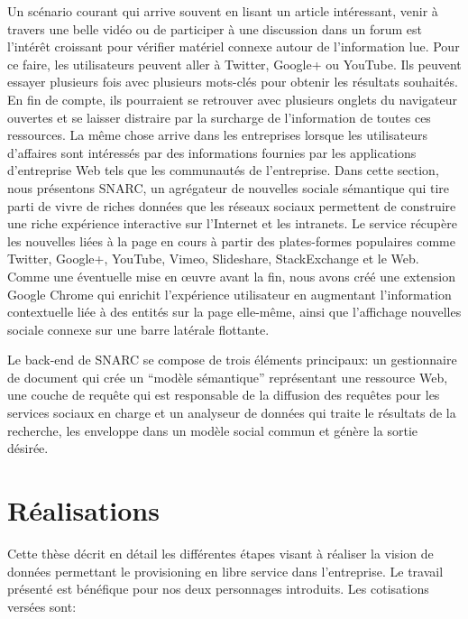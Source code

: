 \documentclass[a4paper,11pt,twoside]{ThesisStyle}
\begin{document}
Un scénario courant qui arrive souvent en lisant un article intéressant, venir à travers une belle vidéo ou de participer à une discussion dans un forum est l'intérêt croissant pour vérifier matériel connexe autour de l'information lue. Pour ce faire, les utilisateurs peuvent aller à Twitter, Google+ ou YouTube. Ils peuvent essayer plusieurs fois avec plusieurs mots-clés pour obtenir les résultats souhaités. En fin de compte, ils pourraient se retrouver avec plusieurs onglets du navigateur ouvertes et se laisser distraire par la surcharge de l'information de toutes ces ressources. La même chose arrive dans les entreprises lorsque les utilisateurs d'affaires sont intéressés par des informations fournies par les applications d'entreprise Web tels que les communautés de l'entreprise. Dans cette section, nous présentons SNARC, un agrégateur de nouvelles sociale sémantique qui tire parti de vivre de riches données que les réseaux sociaux permettent de construire une riche expérience interactive sur l'Internet et les intranets. Le service récupère les nouvelles liées à la page en cours à partir des plates-formes populaires comme Twitter, Google+, YouTube, Vimeo, Slideshare, StackExchange et le Web. Comme une éventuelle mise en œuvre avant la fin, nous avons créé une extension Google Chrome qui enrichit l'expérience utilisateur en augmentant l'information contextuelle liée à des entités sur la page elle-même, ainsi que l'affichage nouvelles sociale connexe sur une barre latérale flottante.

Le back-end de SNARC se compose de trois éléments principaux: un gestionnaire de document qui crée un ``modèle sémantique'' représentant une ressource Web, une couche de requête qui est responsable de la diffusion des requêtes pour les services sociaux en charge et un analyseur de données qui traite le résultats de la recherche, les enveloppe dans un modèle social commun et génère la sortie désirée.


\chapter{Réalisations}

Cette thèse décrit en détail les différentes étapes visant à réaliser la vision de données permettant le provisioning en libre service dans l'entreprise. Le travail présenté est bénéfique pour nos deux personnages introduits. Les cotisations versées sont: \\
\end{document}
